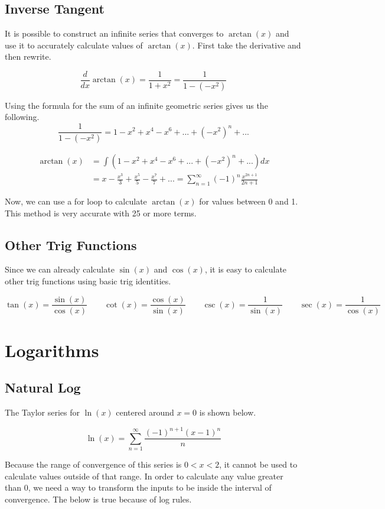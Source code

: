 \documentclass[12pt, letterpaper]{article}
\begin{document}
\subsection{Inverse Tangent}
It is possible to construct an infinite series that converges to $\arctan(x)$ and use it to accurately calculate values of $\arctan(x)$. First take the derivative and then rewrite.

\[ \frac{d}{dx} \arctan(x) = \frac{1}{1 + x^2} = \frac{1}{1 - (-x^2)}\]

Using the formula for the sum of an infinite geometric series gives us the following.
\[ \frac{1}{1 - (-x^2)} = 1 - x^2 + x^4 - x^6 + ... + (-x^2)^n + ... \]

\begin{align*}
  \arctan(x) &= \int \left(1 - x^2 + x^4 - x^6 + ... + (-x^2)^n + ...\right)dx \\ 
  &= x - \frac{x^3}{3} + \frac{x^5}{5} - \frac{x^7}{7} + ... = \sum_{n=1}^{\infty}\left(-1\right)^{n}\frac{x^{2n+1}}{2n+1}
\end{align*}

Now, we can use a for loop to calculate $\arctan(x)$ for values between 0 and 1. This method is very accurate with 25 or more terms.

\subsection{Other Trig Functions}
Since we can already calculate $\sin(x)$ and $\cos(x)$, it is easy to calculate other trig functions using basic trig identities.

\[ \tan(x) = \frac{\sin(x)}{\cos(x)} \qquad \cot(x) = \frac{\cos(x)}{\sin(x)}  \qquad \csc(x) = \frac{1}{\sin(x)} \qquad \sec(x) = \frac{1}{\cos(x)}
\]

\section{Logarithms}
\subsection{Natural Log}
The Taylor series for $\ln(x)$ centered around $x=0$ is shown below.

\[ \ln(x) = \sum_{n=1}^{\infty}\frac{\left(-1\right)^{n+1}\left(x-1\right)^{n}}{n} \]

Because the range of convergence of this series is $0<x<2$, it cannot be used to calculate values outside of that range. In order to calculate any value greater than 0, we need a way to transform the inputs to be inside the interval of convergence. The below is true because of log rules.
\end{document}
